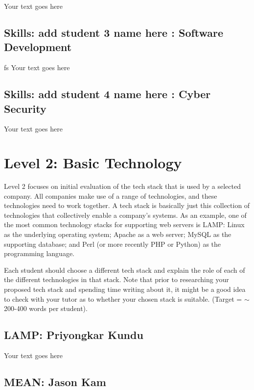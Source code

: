 \documentclass[a4paper, 11pt]{report}
\begin{document}
Your text goes here

\subsection{Skills: add student 3 name here : Software Development}
fs
Your text goes here

\subsection{Skills: add student 4 name here : Cyber Security}

Your text goes here



\newpage
\section{Level 2: Basic Technology}

Level 2 focuses on initial evaluation of the tech stack that is used by a selected company. All companies make use of a range of technologies, and these technologies need to work together. A tech stack is basically just this collection of technologies that collectively enable a company's systems. As an example, one of the most common technology stacks for supporting web servers is LAMP: Linux as the underlying operating system; Apache as a web server; MySQL as the supporting database; and Perl (or more recently PHP or Python) as the programming language.

Each student should choose a different tech stack and explain the role of each of the different technologies in that stack. Note that prior to researching your proposed tech stack and spending time writing about it, it might be a good idea to check with your tutor as to whether your chosen stack is suitable. (Target = $\sim$200-400 words per student).

\subsection{LAMP: Priyongkar Kundu}

Your text goes here

\subsection{MEAN: Jason Kam}
\end{document}
